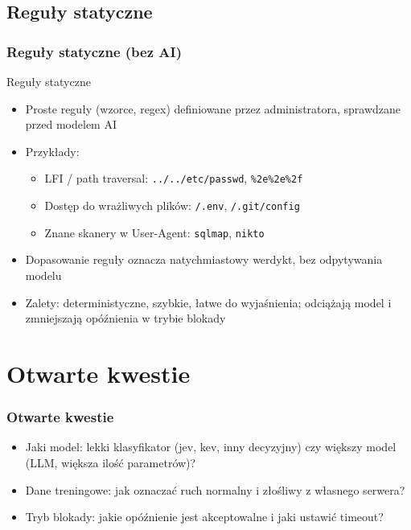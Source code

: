 \documentclass[10pt,xcolor=table]{beamer}
\begin{document}
\subsection{Reguły statyczne}
\begin{frame}
  \frametitle{Reguły statyczne (bez AI)}
  \begin{block}{Reguły statyczne}
  \begin{itemize}
    \item Proste reguły (wzorce, regex) definiowane przez administratora, sprawdzane przed modelem AI
    \item Przykłady:
    \begin{itemize}
      \item LFI / path traversal: \texttt{../../etc/passwd}, \texttt{\%2e\%2e\%2f}
      \item Dostęp do wrażliwych plików: \texttt{/.env}, \texttt{/.git/config}
      \item Znane skanery w User-Agent: \texttt{sqlmap}, \texttt{nikto}
    \end{itemize}
    \item Dopasowanie reguły oznacza natychmiastowy werdykt, bez odpytywania modelu
    \item Zalety: deterministyczne, szybkie, łatwe do wyjaśnienia; odciążają model i zmniejszają opóźnienia w trybie blokady
  \end{itemize}
  \end{block}
\end{frame}
\section{Otwarte kwestie}
\begin{frame}
  \frametitle{Otwarte kwestie}
  \begin{itemize}
    \item Jaki model: lekki klasyfikator (jev, kev, inny decyzyjny) czy większy model (LLM, większa ilość parametrów)?
    \item Dane treningowe: jak oznaczać ruch normalny i złośliwy z własnego serwera?
    \item Tryb blokady: jakie opóźnienie jest akceptowalne i jaki ustawić timeout?
  \end{itemize}
\end{frame}
\end{document}
